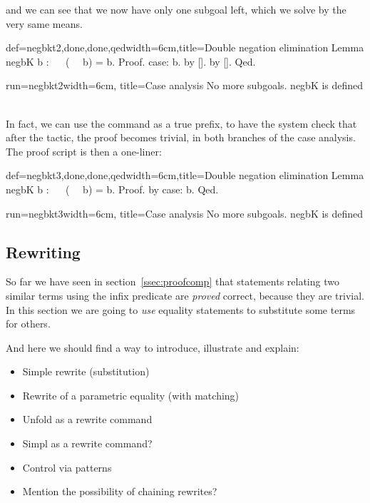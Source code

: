 and we can see that we now have only one subgoal left, which we solve
by the very same means.

\begin{coq}{def=negbkt2,done,done,qed}{width=6cm,title=Double negation elimination}
Lemma negbK b : ~~ (~~ b) = b.
Proof.
case: b.
  by [].
by [].
Qed.
\end{coq}
\begin{coqout}{run=negbkt2}{width=6cm, title=Case analysis}
No more subgoals.
negbK is defined
$~$
$~$
$~$
$~$
\end{coqout}

In fact, we can use the  command as a true prefix, to have the
system check that after the  tactic, the proof becomes
trivial, in both branches of the case analysis. The proof script is
then a one-liner:

\begin{coq}{def=negbkt3,done,done,qed}{width=6cm,title=Double negation elimination}
Lemma negbK b : ~~ (~~ b) = b.
Proof. by case: b. Qed.
\end{coq}
\begin{coqout}{run=negbkt3}{width=6cm, title=Case analysis}
No more subgoals.
negbK is defined
\end{coqout}

\subsection{Rewriting}

So far we have seen in section~\ref{ssec:proofcomp} that statements
relating two similar terms using the \C{=} infix predicate are \emph{proved}
correct, because they are trivial.
 In this
section we are going to \emph{use} equality statements to substitute
some terms for others.

And here we should find a way to introduce, illustrate and explain:
\begin{itemize}
\item Simple rewrite (substitution)
\item Rewrite of a parametric equality (with matching)
\item Unfold as a rewrite command
\item Simpl as a rewrite command?
\item Control via patterns
\item Mention the possibility of chaining rewrites?
\end{itemize}

